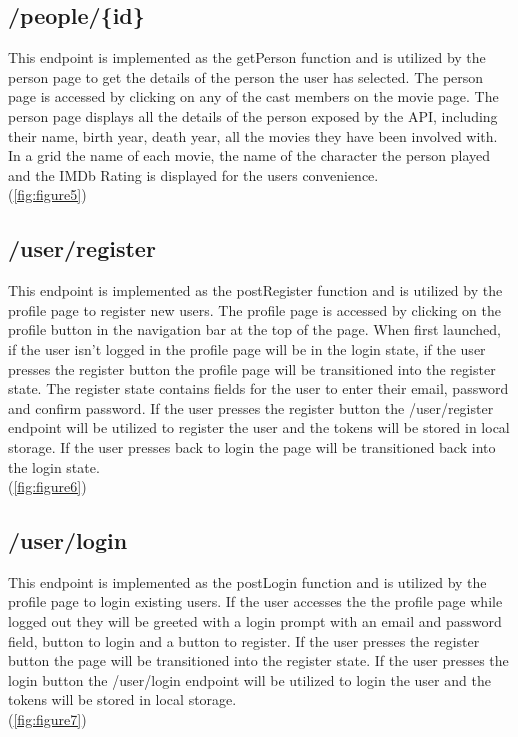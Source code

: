 \documentclass[12pt,a4paper]{article}
\begin{document}
		\subsection{/people/\{id\}}
			This endpoint is implemented as the getPerson function and is utilized by the person page 
			to get the details of the person the user has selected. The person page is accessed by 
			clicking on any of the cast members on the movie page. The person page displays all the 
			details of the person exposed by the API, including their name, birth year, death year, 
			all the movies they have been involved with. In a grid the name of each movie, the name 
			of the character the person played and the IMDb Rating is displayed for the users 
			convenience.\\
			(\cref{fig:figure5})

		\subsection{/user/register}
			This endpoint is implemented as the postRegister function and is utilized by the profile 
			page to register new users. The profile page is accessed by clicking on the profile button 
			in the navigation bar at the top of the page. When first launched, if the user isn't logged 
			in the profile page will be in the login state, if the user presses the register button the 
			profile page will be transitioned into the register state. The register state contains 
			fields for the user to enter their email, password and confirm password. If the user 
			presses the register button the /user/register endpoint will be utilized to register the 
			user and the tokens will be stored in local storage. If the user presses back to login the 
			page will be transitioned back into the login state.\\
			(\cref{fig:figure6})

		\subsection{/user/login}
			This endpoint is implemented as the postLogin function and is utilized by the profile page 
			to login existing users. If the user accesses the the profile page while logged out they 
			will be greeted with a login prompt with an email and password field, button to login and 
			a button to register. If the user presses the register button the page will be transitioned 
			into the register state. If the user presses the login button the /user/login endpoint will 
			be utilized to login the user and the tokens will be stored in local storage.\\
			(\cref{fig:figure7})
\end{document}
